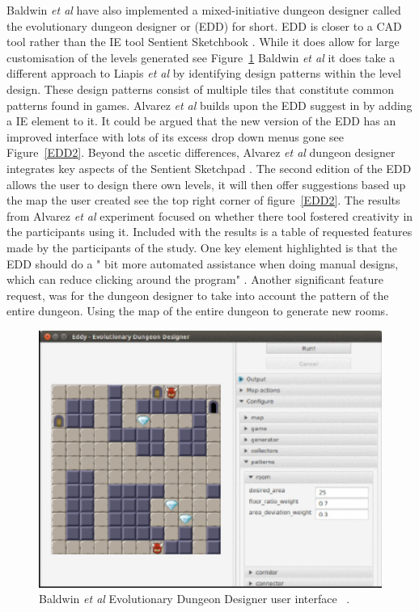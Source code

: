 \documentclass[journal]{IEEEtran}
\begin{document}
Baldwin \textit{et al} \cite{baldwin2017mixed} have also implemented a mixed-initiative dungeon designer called the evolutionary dungeon designer or (EDD) for short. EDD is closer to a CAD tool rather than the IE tool Sentient Sketchbook \cite{liapis2013sentient}. While it does allow for large customisation of the levels generated  see Figure~\ref{EDD}  Baldwin \textit{et al} it does take a different approach to Liapis  \textit{et al}\cite{liapis2013sentient} by identifying design patterns within the level design. These design patterns consist of multiple tiles that constitute common patterns found in games. Alvarez \textit{et al}\cite{alvarez2018fostering} builds upon the EDD suggest in \cite{baldwin2017mixed} by adding a IE element to it. It could be argued that the new version of the EDD has an improved interface with lots of its excess drop down menus gone see Figure~\ref{EDD2}. Beyond the ascetic differences, Alvarez \textit{et al}\cite{alvarez2018fostering} dungeon designer integrates key aspects of  the Sentient Sketchpad \cite{liapis2013sentient}. The second edition of the EDD allows the user to design there own levels, it will then offer suggestions based up the map the user created see the top right corner of figure~\ref{EDD2}.  The results from Alvarez \textit{et al}\cite{alvarez2018fostering} experiment focused on whether there tool fostered creativity in the participants using it. Included with the results is a table of requested features made by the participants of the study. One key element highlighted is that the EDD should do a " bit more automated assistance when doing manual designs, which can reduce clicking around the program" \cite[Table 2]{alvarez2018fostering}. Another significant  feature request, was for the dungeon designer to take into account the pattern of the entire dungeon. Using the map of the entire dungeon to generate new rooms.


\begin{figure}[h]
	\includegraphics[width=1.0\linewidth]{EDD.PNG}
	\caption{ Baldwin \textit{et al} Evolutionary Dungeon Designer user interface  ~\cite{baldwin2017mixed}.}
	\label{EDD}
\end{figure} 
\end{document}
